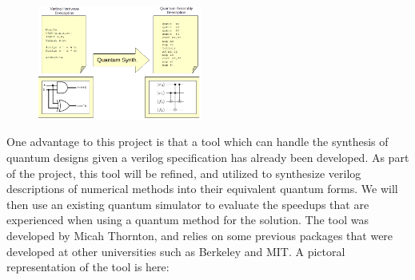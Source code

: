     \begin{figure}
   \begin{center}
    \includegraphics[width=0.48\textwidth]{QuantumSynthesis.png}
  \end{center}
\end{figure}
One advantage to this project is that a tool which can handle the synthesis of quantum designs given a verilog specification has already been developed. 
As part of the project, this tool will be refined, and utilized to synthesize verilog descriptions of numerical methods into their equivalent quantum forms. 
We will then use an existing quantum simulator to evaluate the speedups that are experienced when using a quantum method for the solution. 
The tool was developed by Micah Thornton, and relies on some previous packages that were developed at other universities such as Berkeley and MIT. 
A pictoral representation of the tool is here: 


